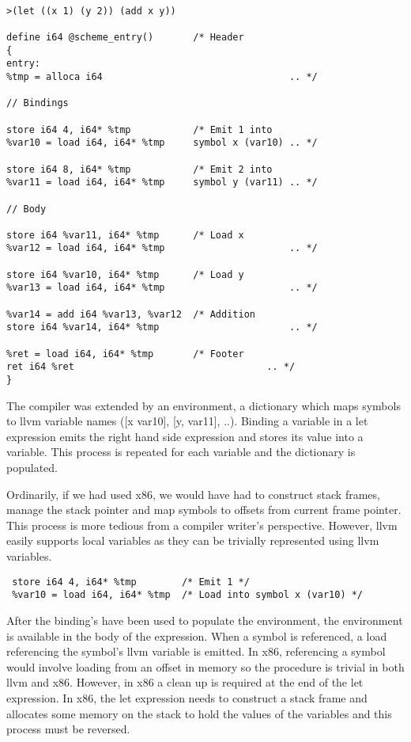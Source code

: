 \documentclass{article}
\begin{document}
\begin{verbatim}

>(let ((x 1) (y 2)) (add x y)) 

define i64 @scheme_entry()       /* Header
{                    
entry: 
%tmp = alloca i64                                 .. */

// Bindings       

store i64 4, i64* %tmp           /* Emit 1 into        
%var10 = load i64, i64* %tmp     symbol x (var10) .. */

store i64 8, i64* %tmp           /* Emit 2 into           
%var11 = load i64, i64* %tmp     symbol y (var11) .. */

// Body

store i64 %var11, i64* %tmp      /* Load x      
%var12 = load i64, i64* %tmp                      .. */

store i64 %var10, i64* %tmp      /* Load y
%var13 = load i64, i64* %tmp                      .. */

%var14 = add i64 %var13, %var12  /* Addition
store i64 %var14, i64* %tmp                       .. */

%ret = load i64, i64* %tmp       /* Footer
ret i64 %ret                                  .. */
}

\end{verbatim}

The compiler was extended by an environment, a dictionary which maps symbols to llvm variable names ([x var10], [y, var11], ..). Binding a variable in a let expression emits the right hand side expression and stores its value into a variable. This process is repeated for each variable and the dictionary is populated. 

Ordinarily, if we had used x86, we would have had to construct stack frames, manage the stack pointer and map symbols to offsets from current frame pointer. This process is more tedious from a compiler writer's perspective. However, llvm easily supports local variables as they can be trivially represented using llvm variables.

\begin{verbatim}
 store i64 4, i64* %tmp        /* Emit 1 */
 %var10 = load i64, i64* %tmp  /* Load into symbol x (var10) */  
\end{verbatim}

 After the binding's have been used to populate the environment, the environment is available in the body of the expression.  When a symbol is referenced, a load referencing the symbol's llvm variable is emitted. In x86, referencing a symbol would involve loading from an offset in memory so the procedure is trivial in both llvm and x86. However, in x86 a clean up is required at the end of the let expression. In x86, the let expression needs to construct a stack frame and allocates some memory on the stack to hold the values of the variables and this process must be reversed. 
 
\end{document}
